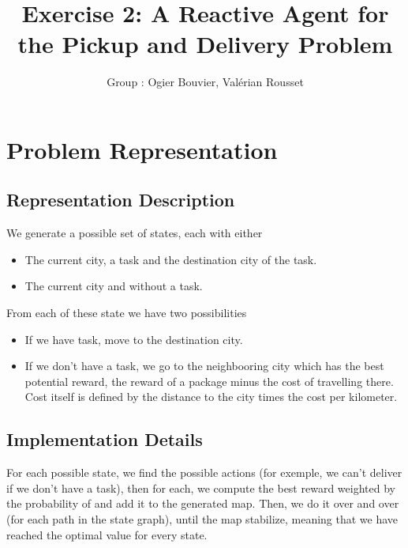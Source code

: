 \documentclass[11pt]{article}
\title{\bf Exercise 2: A Reactive Agent for the Pickup and Delivery Problem}
\author{Group \textnumero 17: Ogier Bouvier, Val\'erian Rousset}
\begin{document}
\maketitle

\section{Problem Representation}

\subsection{Representation Description}

We generate a possible set of states, each with either

\begin{itemize}
	\item The current city, a task and the destination city of the task.
	\item The current city and without a task.
\end{itemize}

From each of these state we have two possibilities

\begin{itemize}
	\item If we have task, move to the destination city.
	\item If we don't have a task, we go to the neighbooring city which
		has the best potential reward, the reward of a package minus
		the cost of travelling there. Cost itself is defined by the
		distance to the city times the cost per kilometer.
\end{itemize}

\subsection{Implementation Details}

For each possible state, we find the possible actions (for exemple, we can't
deliver if we don't have a task), then for each, we compute the best
reward weighted by the probability of  and add it to the generated
map. Then, we do it over and over (for each path in the state graph),
until the map stabilize, meaning that we have reached the optimal
value for every state.
\end{document}
